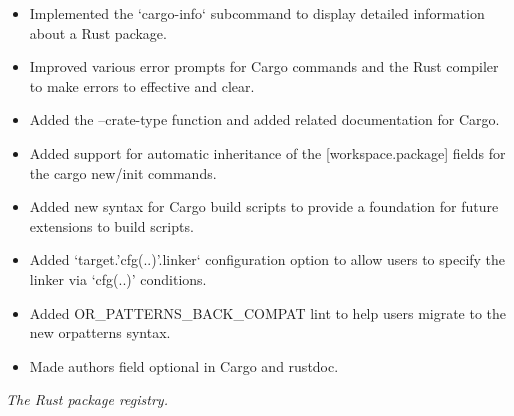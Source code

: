 \documentclass{software_engineer_poe_liu}
\newcommand{\en}[1]{#1}
\newcommand{\zh}[1]{}
\begin{document}
\begin{itemize}
      \item \en{Implemented the `cargo-info` subcommand to display detailed information about a Rust package.}
            \zh{为 Cargo 实现了 `cargo-info` 子命令来展示包的详细信息。}
      \item \en{Improved various error prompts for Cargo commands and the Rust compiler to make errors to effective and clear.}
            \zh{改善了大量 Cargo 命令和 Rust 编译器的错误提示，让错误更有效更清晰。}
      \item \en{Added the --crate-type function and added related documentation for Cargo.}
            \zh{为 Cargo 添加了 --crate-type 功能和相关文档。}
      \item \en{Added support for automatic inheritance of the [workspace.package] fields for the cargo new/init commands.}
            \zh{为 cargo new 和 cargo init 命令支持了 [workspace.package] 字段自动继承。}
      \item \en{Added new syntax for Cargo build scripts to provide a foundation for future extensions to build scripts.}
            \zh{为 Cargo 构建脚本添加新的语法，为未来扩展构建脚本提供基础。}
      \item \en{Added `target.'cfg(..)'.linker` configuration option to allow users to specify the linker via `cfg(..)' conditions.}
            \zh{添加了 `target.'cfg(..)'.linker` 配置项，允许用户通过 `cfg(..)' 条件来指定链接器。}
      \item \en{Added OR\_PATTERNS\_BACK\_COMPAT lint to help users migrate to the new or\-patterns syntax.}
            \zh{添加了 OR\_PATTERNS\_BACK\_COMPAT lint 来帮助用户迁移至新的 or\-patterns 语法。}
      \item \en{Made authors field optional in Cargo and rustdoc.}
            \zh{使 authors 字段在 Cargo 和 rustdoc 中可选。}
\end{itemize}


\en{}
\zh{\datedsubsection{\textbf{crates.io(Rust/JS) - 维护者}}{{\href{https://github.com/rust-lang/crates.io/commits?author=0xPoe}{131+ commits}}}}
\en{\textsl{The Rust package registry.}}
\zh{\textsl{Rust 包管理中心。}}
\end{document}
